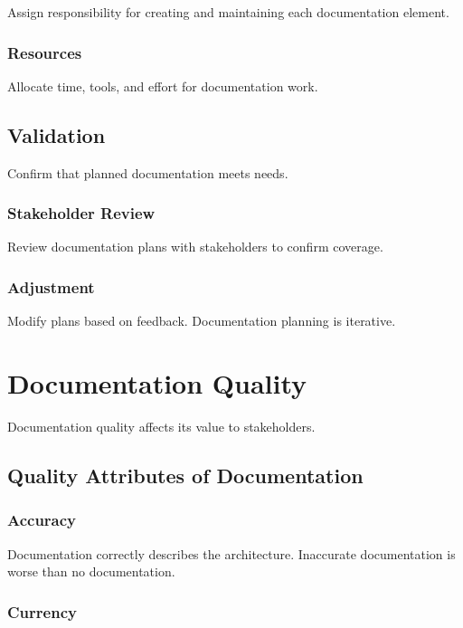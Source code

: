 \documentclass[11pt]{article}
\begin{document}
Assign responsibility for creating and maintaining each documentation element.

\subsubsection{Resources}

Allocate time, tools, and effort for documentation work.

\subsection{Validation}

Confirm that planned documentation meets needs.

\subsubsection{Stakeholder Review}

Review documentation plans with stakeholders to confirm coverage.

\subsubsection{Adjustment}

Modify plans based on feedback. Documentation planning is iterative.

\section{Documentation Quality}

Documentation quality affects its value to stakeholders.

\subsection{Quality Attributes of Documentation}

\subsubsection{Accuracy}

Documentation correctly describes the architecture. Inaccurate documentation is worse than no documentation.

\subsubsection{Currency}
\end{document}
